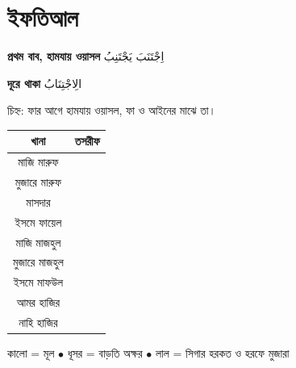 \newpage

\section{ইফতিআল}

\begin{center}
  \textbf{প্রথম বাব, হামযায় ওয়াসল}
  \enspace
  {\arabicfont \textarabic{اِجْتَنَبَ يَجْتَنِبُ}}
\end{center}

\vspace{0.2cm}

\begin{center}
  \textbf{দূরে থাকা}
  \enspace
  {\arabicfont \textarabic{الِاجْتِنَابُ}}
\end{center}

\vspace{0.25cm}

\noindent চিহ্ন: ফার আগে হামযায় ওয়াসল, ফা ও আইনের মাঝে তা।

\vspace{0.3cm}

\begingroup
\setlength{\arrayrulewidth}{0.5pt}
\setlength{\tabcolsep}{4pt}
\renewcommand{\arraystretch}{1.85}

\noindent\begin{tabularx}{\textwidth}{|C|C|}
  \hline
  {\color{white}\textbf{খানা}} &
  {\color{white}\textbf{তসরীফ}} \\
  \hline
  মাজি মারুফ &
  {\arabicfont {}} \\
  \hline
  মুজারে মারুফ &
  {\arabicfont {}} \\
  \hline
  মাসদার &
  {\arabicfont \textarabic{}} \\
  \hline
  ইসমে ফায়েল &
  {\arabicfont \textarabic{}} \\
  \hline
  মাজি মাজহুল &
  {\arabicfont {}} \\
  \hline
  মুজারে মাজহুল &
  {\arabicfont {}} \\
  \hline
  ইসমে মাফউল &
  {\arabicfont \textarabic{}} \\
  \hline
  আমর হাজির &
  {\arabicfont {}} \\
  \hline
  নাহি হাজির &
  {\arabicfont {}} \\
  \hline
\end{tabularx}
\endgroup

\vspace{0.25cm}

\begin{center}
  {\small
    কালো = মূল
    \enspace$\bullet$\enspace
    ধূসর = বাড়তি অক্ষর
    \enspace$\bullet$\enspace
    লাল = সিগার হরকত ও হরফে মুজারা
  }
\end{center}
